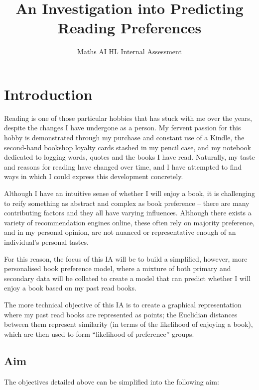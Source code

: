 \documentclass[12pt]{article}
\title{\textbf{An Investigation into Predicting Reading Preferences}} %
\author{Maths AI HL Internal Assessment} %
\begin{document}
\doublespacing

\maketitle %
\thispagestyle{empty}
\pagebreak
\tableofcontents
\thispagestyle{empty}

\clearpage
{}

\pagebreak
\section{Introduction} %

Reading is one of those particular hobbies that has stuck with me over the years, despite the
changes I have undergone as a person. My fervent passion for this hobby is demonstrated
through my purchase and constant use of a Kindle, the second-hand bookshop loyalty cards
stashed in my pencil case, and my notebook dedicated to logging words, quotes and the
books I have read. Naturally, my taste and reasons for reading have changed over time, and
I have attempted to find ways in which I could express this development concretely.

Although I have an intuitive sense of whether I will enjoy a book, it is challenging to reify
something as abstract and complex as book preference -- there are many contributing factors
and they all have varying influences. Although there exists a variety of recommendation
engines online, these often rely on majority preference, and in my personal opinion, are not
nuanced or representative enough of an individual's personal tastes.

For this reason, the focus of this IA will be to build a simplified, however, more personalised
book preference model, where a mixture of both primary and secondary data will be collated
to create a model that can predict whether I will enjoy a book based on my past read books.

The more technical objective of this IA is to create a graphical representation where my past
read books are represented as points; the Euclidian distances between them represent
similarity (in terms of the likelihood of enjoying a book), which are then used to form
“likelihood of preference” groups.

\subsection{Aim}
The objectives detailed above can be simplified into the following aim:
\end{document}
